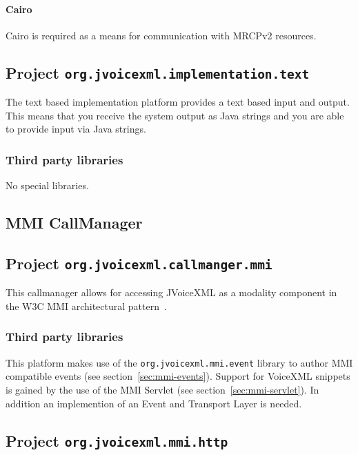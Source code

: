 \documentclass[11pt,a4paper]{article}
\begin{document}
\paragraph{Cairo}

Cairo is required as a means for communication with MRCPv2 resources.

\subsection{Project \texttt{org.jvoicexml.implementation.text}}

The text based implementation platform provides a text based input and output.
This means that you receive the system output as Java strings and you are able
to provide input via Java strings.

\subsubsection{Third party libraries}
\label{sec:text-third-party-libr}

No special libraries.

\subsection{MMI CallManager}
\subsection{Project \texttt{org.jvoicexml.callmanger.mmi}}

This callmanager allows for accessing JVoiceXML as a modality component in
the W3C MMI architectural pattern~\cite{w3c:2012:mmi_arch}.

\subsubsection{Third party libraries}

This platform makes use of the \lstinline{org.jvoicexml.mmi.event} library
to author MMI compatible events (see section~\ref{sec:mmi-events}).
Support for VoiceXML snippets is gained by the use of the MMI Servlet
(see section~\ref{sec:mmi-servlet}).
In addition an implemention of an Event and Transport Layer is needed.

\subsection{Project \texttt{org.jvoicexml.mmi.http}}
\end{document}
